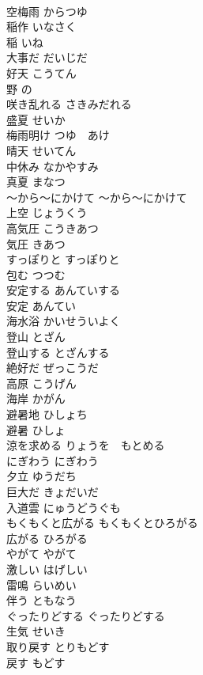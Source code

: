 \documentclass[8pt]{extreport}
\begin{document}
\begin{CJK}{UTF8}{min}
\\	空梅雨	からつゆ	
\\	稲作	いなさく	
\\	稲	いね	
\\	大事だ	だいじだ	
\\	好天	こうてん	
\\	野	の	
\\	咲き乱れる	さきみだれる	
\\	盛夏	せいか	
\\	梅雨明け	つゆ　あけ	
\\	晴天	せいてん	
\\	中休み	なかやすみ	
\\	真夏	まなつ	
\\	〜から〜にかけて	〜から〜にかけて	
\\	上空	じょうくう	
\\	高気圧	こうきあつ	
\\	気圧	きあつ	
\\	すっぽりと	すっぽりと	
\\	包む	つつむ	
\\	安定する	あんていする	
\\	安定	あんてい	
\\	海水浴	かいせういよく	
\\	登山	とざん	
\\	登山する	とざんする	
\\	絶好だ	ぜっこうだ	
\\	高原	こうげん	
\\	海岸	かがん	
\\	避暑地	ひしょち	
\\	避暑	ひしょ	
\\	涼を求める	りょうを　もとめる	
\\	にぎわう	にぎわう	
\\	夕立	ゆうだち	
\\	巨大だ	きょだいだ	
\\	入道雲	にゅうどうぐも	
\\	もくもくと広がる	もくもくとひろがる	
\\	広がる	ひろがる	
\\	やがて	やがて	
\\	激しい	はげしい	
\\	雷鳴	らいめい	
\\	伴う	ともなう	
\\	ぐったりどする	ぐったりどする	
\\	生気	せいき	
\\	取り戻す	とりもどす	
\\	戻す	もどす	

\end{CJK}
\end{document}
